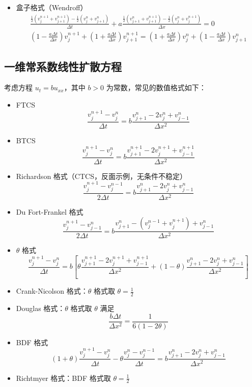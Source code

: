 \begin{itemize}
\[          \]
    \item 盒子格式（Wendroff）
          \begin{gather*}
              \frac{\frac12(v_j^{n+1} + v_{j+1}^{n+1}) - \frac12(v_j^n + v_{j+1}^n)}{\Delta t} + a \frac{\frac12(v_{j+1}^n + v_{j+1}^{n+1})-\frac12(v_j^n + v_j^{n+1})}{\Delta x} = 0 \\
              \left(1 - \frac{a \Delta t}{\Delta x}\right)v_j^{n+1} + \left(1 + \frac{a \Delta t}{\Delta x}\right)v_{j+1}^{n+1} =
              \left(1 + \frac{a \Delta t}{\Delta x}\right)v_j^{n} + \left(1 - \frac{a \Delta t}{\Delta x}\right)v_{j+1}^{n}
          \end{gather*}
\end{itemize}


\subsection*{一维常系数线性扩散方程}

考虑方程 $u_t = b u_{xx}$，其中 $b > 0$ 为常数，常见的数值格式如下：
\begin{itemize}
    \item FTCS
          \[
              \frac{v_{j}^{n+1} - v_{j}^n}{\Delta t} = b \frac{v_{j+1}^n - 2v_{j}^n + v_{j-1}^n}{\Delta x^2}
          \]
    \item BTCS
          \[
              \frac{v_{j}^{n+1} - v_{j}^n}{\Delta t} = b \frac{v_{j+1}^{n+1} - 2v_{j}^{n+1} + v_{j-1}^{n+1}}{\Delta x^2}
          \]
    \item Richardson 格式（CTCS，反面示例，无条件不稳定）
          \[
              \frac{v_{j}^{n+1} - v_{j}^{n-1}}{2\Delta t} = b \frac{v_{j+1}^{n} - 2v_{j}^{n} + v_{j-1}^{n}}{\Delta x^2}
          \]
    \item Du Fort-Frankel 格式
          \[
              \frac{v_j^{n+1}-v_{j-1}^n}{2\Delta t} = b \frac{v_{j+1}^n - (v_{j}^{n-1}+v_j^{n+1}) + v_{j-1}^n}{\Delta x^2}
          \]
    \item $\theta$ 格式
          \[
              \frac{v_{j}^{n+1} - v_{j}^n}{\Delta t}
              =
              b \left[
                  \theta \frac{v_{j+1}^{n+1} - 2v_{j}^{n+1} + v_{j-1}^{n+1}}{\Delta x^2}
                  + (1-\theta) \frac{v_{j+1}^n - 2v_{j}^n + v_{j-1}^n}{\Delta x^2}
                  \right]
          \]
    \item Crank-Nicolson 格式：$\theta$ 格式取 $\theta = \frac12$
    \item Douglas 格式：$\theta$ 格式取 $\theta$ 满足
          \[
              \frac{b \Delta t}{\Delta x^2} = \frac{1}{6(1-2\theta)}
          \]
    \item BDF 格式
          \[
              (1+\theta)\frac{v_{j}^{n+1} - v_{j}^{n}}{\Delta t}
              - \theta \frac{v_j^n - v_j^{n-1}}{\Delta t}
              = b \frac{v_{j+1}^{n} - 2v_{j}^{n} + v_{j-1}^{n}}{\Delta x^2}
          \]
    \item Richtmyer 格式：BDF 格式取 $\theta = \frac12$
\end{itemize}

